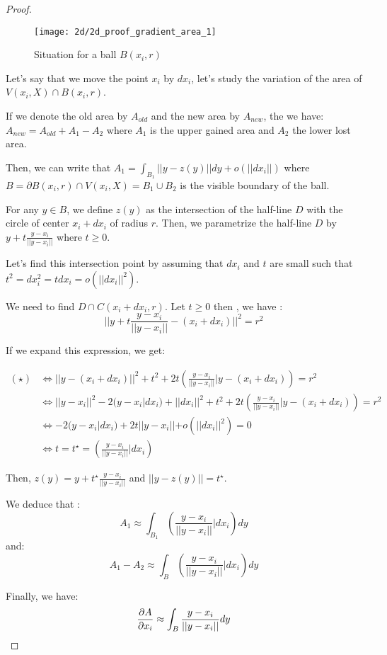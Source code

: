 \begin{proof}

\begin{figure}[H]
    \centering
    \texttt{[image: 2d/2d\_proof\_gradient\_area\_1]}
    \caption{Situation for a ball $ B(x_i, r) $}
\end{figure}

Let's say that we move the point $ x _i $ by $ dx_i $, let's study the variation
of the area of $ V(x_i, X) \cap B(x_i, r) $.

If we denote the old area by $ A_{old} $ and the new area by $ A_{new} $, the we
have: $ A_{new} = A_{old} + A_1 - A_2 $ where $ A_1 $ is the upper gained area
and $ A_2 $ the lower lost area.

Then, we can write that $ A_1 = \int_{B_1} || y - z(y) || dy + o(||dx_i||) $ where $ B =
\partial B(x_i, r) \cap V(x_i, X) = B_1 \cup B_2 $ is the visible boundary of
the ball.

For any $ y \in B $, we define $ z(y) $ as the intersection of the half-line $ D $
with the circle of center $ x_i + dx_i $ of radius $ r $.
Then, we parametrize the half-line $ D $ by $ y + t \frac{y - x_i}{||y - x_i||}
$ where $ t \ge 0 $.

Let's find this intersection point by assuming that $ dx_i $ and $ t $ are small
such that $ t^2 = dx_i^2 = t dx_i = o(||dx_i||^2) $.

We need to find $ D \cap C(x_i + dx_i, r) $. Let $ t \ge 0 $ then , we have :
\begin{equation}
    || y + t \frac{y - x_i}{|| y - x_i||} - (x_i + dx_i) ||^2 = r^2
    \tag{$\star$}
\end{equation}

If we expand this expression, we get:

\begin{align*}
    (\star) & \iff || y
    - (x_i + dx_i) ||^2 + t^2 + 2t \left( \frac{y-x_i}{|| y - x_i||} | y - (x_i
        + dx_i) \right) = r^2 \\
    & \iff || y - x_i || ^2 - 2 (y - x_i | dx_i) + || dx_i || ^2 + t^2 + 2t
    \left( \frac{y-x_i}{|| y - x_i||} | y - (x_i + dx_i) \right) = r^2 \\
    & \iff -2 (y - x_i | dx_i) + 2t || y - x_i|| + o(||dx_i||^2) = 0 \\
    & \iff t = t^{\star} = \left( \frac{y - x_i}{||y - x_i||} | dx_i \right)
\end{align*}

Then, $ z(y) = y + t^{\star} \frac{y - x_i}{||y - x_i||} $ and $ || y - z(y) || =
t^{\star} $.

We deduce that :
$$ A_1 \approx \int_{B_1} \left( \frac{y - x_i}{||y - x_i||} | dx_i \right) dy $$
and:
$$ A_1 - A_2 \approx \int_{B} \left( \frac{y - x_i}{||y - x_i||} | dx_i \right) dy $$

Finally, we have:
$$ \frac{\partial{A}}{\partial{x_i}} \approx \int_{B} \frac{y - x_i}{||y - x_i||} dy $$

\end{proof}

